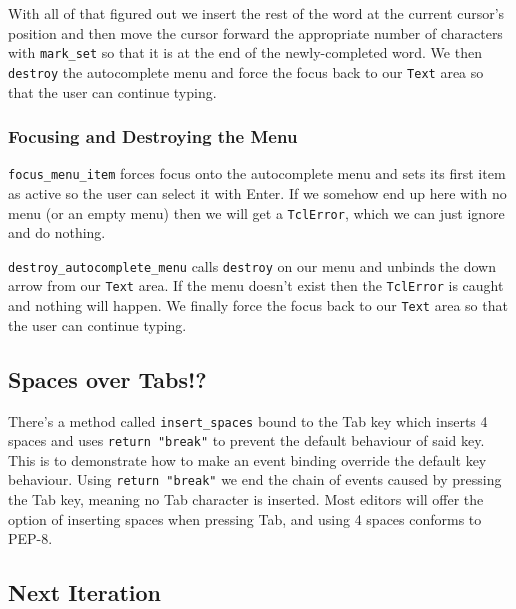 \documentclass[a4paper,11pt,openany]{book}
\begin{document}
\vspace{5mm}

With all of that figured out we insert the rest of the word at the current cursor's position and then move the cursor forward the appropriate number of characters with \lstinline[columns=fixed]{mark_set} so that it is at the end of the newly-completed word. We then \lstinline[columns=fixed]{destroy} the autocomplete menu and force the focus back to our \lstinline[columns=fixed]{Text} area so that the user can continue typing.

\subsubsection{Focusing and Destroying the Menu}

\lstinline[columns=fixed]{focus_menu_item} forces focus onto the autocomplete menu and sets its first item as active so the user can select it with Enter. If we somehow end up here with no menu (or an empty menu) then we will get a \lstinline[columns=fixed]{TclError}, which we can just ignore and do nothing.

\vspace{5mm}

\lstinline[columns=fixed]{destroy_autocomplete_menu} calls \lstinline[columns=fixed]{destroy} on our menu and unbinds the down arrow from our \lstinline[columns=fixed]{Text} area. If the menu doesn't exist then the \lstinline[columns=fixed]{TclError} is caught and nothing will happen. We finally force the focus back to our \lstinline[columns=fixed]{Text} area so that the user can continue typing. 

\subsection{Spaces over Tabs!?}

There's a method called \lstinline[columns=fixed]{insert_spaces} bound to the Tab key which inserts 4 spaces and uses \lstinline[columns=fixed]{return "break"} to prevent the default behaviour of said key. This is to demonstrate how to make an event binding override the default key behaviour. Using \lstinline[columns=fixed]{return "break"} we end the chain of events caused by pressing the Tab key, meaning no Tab character is inserted. Most editors will offer the option of inserting spaces when pressing Tab, and using 4 spaces conforms to PEP-8.
 
\subsection{Next Iteration}
\end{document}
